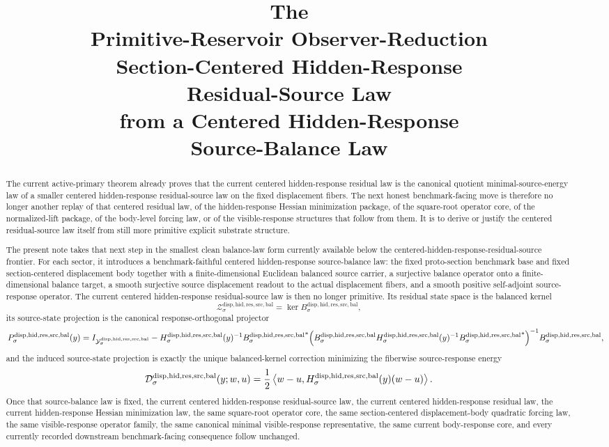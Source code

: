 \documentclass[11pt]{article}
\title{\textbf{The \TheoryName{}}\\[0.4em]
\large Primitive-Reservoir Observer-Reduction\\
\large Section-Centered Hidden-Response\\
\large Residual-Source Law\\
\large from a Centered Hidden-Response\\
\large Source-Balance Law}
\author{}
\date{}
\newcommand{\BalancedSourceCarrier}[1]{\mathcal Y_{#1}^{\mathrm{disp,hid,res,src,bal}}}
\newcommand{\SourceBalanceOperator}[1]{B_{#1}^{\mathrm{disp,hid,res,src,bal}}}
\newcommand{\SourceBalancedState}[1]{\mathcal Z_{#1}^{\mathrm{disp,hid,res,src,bal}}}
\newcommand{\SourceBalanceResponse}[1]{H_{#1}^{\mathrm{disp,hid,res,src,bal}}}
\newcommand{\BalancedProjection}[1]{P_{#1}^{\mathrm{disp,hid,res,src,bal}}}
\newcommand{\SourceBalanceCorrectionEnergy}[1]{\mathcal D_{#1}^{\mathrm{disp,hid,res,src,bal}}}
\begin{document}
\maketitle

\begin{abstract}
The current active-primary theorem already proves that the current centered hidden-response residual law is the canonical quotient minimal-source-energy law of a smaller centered hidden-response residual-source law on the fixed displacement fibers. The next honest benchmark-facing move is therefore no longer another replay of that centered residual law, of the hidden-response Hessian minimization package, of the square-root operator core, of the normalized-lift package, of the body-level forcing law, or of the visible-response structures that follow from them. It is to derive or justify the centered residual-source law itself from still more primitive explicit substrate structure.

The present note takes that next step in the smallest clean balance-law form currently available below the centered-hidden-response-residual-source frontier. For each sector, it introduces a benchmark-faithful centered hidden-response source-balance law: the fixed proto-section benchmark base and fixed section-centered displacement body together with a finite-dimensional Euclidean balanced source carrier, a surjective balance operator onto a finite-dimensional balance target, a smooth surjective source displacement readout to the actual displacement fibers, and a smooth positive self-adjoint source-response operator. The current centered hidden-response residual-source law is then no longer primitive. Its residual state space is the balanced kernel
\[
\SourceBalancedState{\sigma}=\ker \SourceBalanceOperator{\sigma},
\]
its source-state projection is the canonical response-orthogonal projector
\[
\BalancedProjection{\sigma}(y)
=
I_{\BalancedSourceCarrier{\sigma}}
-\SourceBalanceResponse{\sigma}(y)^{-1}
{\SourceBalanceOperator{\sigma}}^{*}
\Bigl(
\SourceBalanceOperator{\sigma}
\SourceBalanceResponse{\sigma}(y)^{-1}
{\SourceBalanceOperator{\sigma}}^{*}
\Bigr)^{-1}
\SourceBalanceOperator{\sigma},
\]
and the induced source-state projection is exactly the unique balanced-kernel correction minimizing the fiberwise source-response energy
\[
\SourceBalanceCorrectionEnergy{\sigma}(y;w,u)
=
\frac{1}{2}
\ev{
w-u,
\SourceBalanceResponse{\sigma}(y)(w-u)
}.
\]
Once that source-balance law is fixed, the current centered hidden-response residual-source law, the current centered hidden-response residual law, the current hidden-response Hessian minimization law, the same square-root operator core, the same section-centered displacement-body quadratic forcing law, the same visible-response operator family, the same canonical minimal visible-response representative, the same current body-response core, and every currently recorded downstream benchmark-facing consequence follow unchanged.


\end{abstract}
\end{document}
